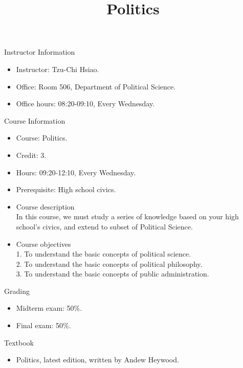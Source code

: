 \documentclass{article}
\title{\fontsize{16pt}{16pt}\selectfont Politics}
\author{}
\date{}
\begin{document}
\maketitle
\fontsize{14pt}{14pt}\selectfont
\begin{flushleft}
Instructor Information
\end{flushleft}
\begin{itemize}
\item Instructor: Tzu-Chi Hsiao. \\
\item Office: Room 506, Department of Political Science. \\
\item Office hours: 08:20-09:10, Every Wednesday. \\
\end{itemize}
Course Information \\
\begin{itemize}
\item Course: Politics. \\
\item Credit: 3. \\
\item Hours: 09:20-12:10, Every Wednesday. \\
\item Prerequisite: High school civics. \\
\item Course description \\
In this course, we must study a series of knowledge based on your high school's civics, and extend to subset of Political Science. \\ 
\item Course objectives \\
1. To understand the basic concepts of political science. \\
2. To understand the basic concepts of political philosophy. \\
3. To understand the basic concepts of public administration. \\
\end{itemize}
\begin{flushleft}
Grading \\
\end{flushleft}
\begin{itemize}
\item Midterm exam: 50\%. \\
\item Final exam: 50\%. \\
\end{itemize}
Textbook \\
\begin{itemize}
\item Politics, latest edition, written by Andew Heywood. \\
\end{itemize}
\end{document}
